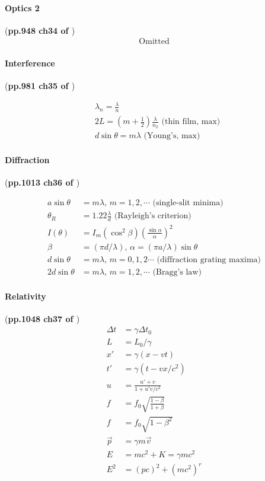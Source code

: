 \documentclass{article}
\numberwithin{equation}{subsection} %
\theoremstyle{definition}
\begin{document}
\paragraph{Optics 2} (\textbf{pp.948 ch34 of \cite{book}})
\begin{align}
    \text{Omitted}
\end{align}

\paragraph{Interference} (\textbf{pp.981 ch35 of \cite{book}})

\begin{align}
    & \lambda_n = \frac{\lambda}{n} \\
    & 2L = (m+\frac{1}{2})\frac{\lambda}{n_2} \text{ (thin film, max)}
    \\
    & d\sin{\theta} = m\lambda \text{ (Young's, max)}
\end{align}

\paragraph{Diffraction} (\textbf{pp.1013 ch36 of \cite{book}})

\begin{align}
    a\sin{\theta} &= m \lambda \text{, $m=1,2,\cdots$ (single-slit
    minima)} \\
    \theta_R &= 1.22\frac{\lambda}{d} \text{ (Rayleigh's criterion)}
    \\
    I(\theta) &=  I_m
      (\cos^2\beta)\left(\frac{\sin{\alpha}}{\alpha}\right)^2 \\
    \beta &= (\pi d/\lambda),\, \alpha = (\pi a/\lambda)\sin\theta \\
    d\sin{\theta} &= m\lambda \text{, $m=0,1,2\cdots$ (diffraction
      grating maxima)} \\
    2d\sin{\theta} &= m\lambda \text{, $m=1,2,\cdots$ (Bragg's law)}
\end{align}

\paragraph{Relativity} (\textbf{pp.1048 ch37 of \cite{book}})
\begin{align}
    \Delta t &= \gamma \Delta t_0 \\
    L &= L_0/\gamma \\
    x' &= \gamma(x-vt) \\
    t' &= \gamma(t-vx/c^2) \\
    u &= \frac{u'+v}{1+u'v/c^2} \\
    f &= f_0 \sqrt{\frac{1-\beta}{1+\beta}} \\
    f &= f_0 \sqrt{1-\beta^2} \\
    \vec{p} &= \gamma m \vec{v} \\
    E &= mc^2 + K = \gamma mc^2 \\
    E^2 &= (pc)^2 + (mc^2)^r
\end{align}
\end{document}
